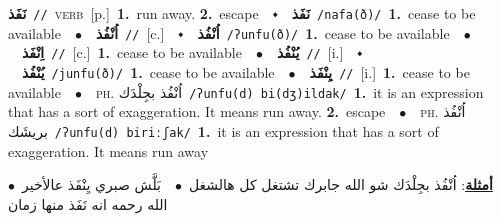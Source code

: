 \documentclass[10pt,a4paper,twoside]{article} %
\begin{document}
\begin{multicols}{2}
{\setlength\topsep{0pt}\textbf{\foreignlanguage{arabic}{نَفَذ}}\ {\color{gray}\texttt{//}\color{black}}\ \textsc{verb}\ [p.]\ \textbf{1.}~run away.  \textbf{2.}~escape\ \ $\smblkdiamond$\ \ \setlength\topsep{0pt}\textbf{\foreignlanguage{arabic}{نَفَذ}}\ {\color{gray}\texttt{/nafa(ð)/}\color{black}}\ \textbf{1.}~cease to be available\ \ $\bullet$\ \ \setlength\topsep{0pt}\textbf{\foreignlanguage{arabic}{اُنْفُذ}}\ {\color{gray}\texttt{//}\color{black}}\ [c.]\ \ $\smblkdiamond$\ \ \setlength\topsep{0pt}\textbf{\foreignlanguage{arabic}{اُنْفُذ}}\ {\color{gray}\texttt{/ʔunfu(ð)/}\color{black}}\ \textbf{1.}~cease to be available\ \ $\bullet$\ \ \setlength\topsep{0pt}\textbf{\foreignlanguage{arabic}{اِنْفَذ}}\ {\color{gray}\texttt{//}\color{black}}\ [c.]\ \textbf{1.}~cease to be available\ \ $\bullet$\ \ \setlength\topsep{0pt}\textbf{\foreignlanguage{arabic}{يُنْفُذ}}\ {\color{gray}\texttt{//}\color{black}}\ [i.]\ \ $\smblkdiamond$\ \ \setlength\topsep{0pt}\textbf{\foreignlanguage{arabic}{يُنْفُذ}}\ {\color{gray}\texttt{/junfu(ð)/}\color{black}}\ \textbf{1.}~cease to be available\ \ $\bullet$\ \ \setlength\topsep{0pt}\textbf{\foreignlanguage{arabic}{يِنْفَذ}}\ {\color{gray}\texttt{//}\color{black}}\ [i.]\ \textbf{1.}~cease to be available\ \ $\bullet$\ \ \textsc{ph.} \color{gray} \foreignlanguage{arabic}{اُنْفُذ بجِلْدَك}\color{black}\ {\color{gray}\texttt{/{\sffamily ʔunfu(d) bi(dʒ)ildak}/}\color{black}}\ \textbf{1.}~it is an expression that has a sort of exaggeration. It means run away.  \textbf{2.}~escape\ \ $\bullet$\ \ \textsc{ph.} \color{gray} \foreignlanguage{arabic}{اُنْفُذ بريشَك}\color{black}\ {\color{gray}\texttt{/{\sffamily ʔunfu(d) biriːʃak}/}\color{black}}\ \textbf{1.}~it is an expression that has a sort of exaggeration. It means run away\  \begin{flushright}\color{gray}\foreignlanguage{arabic}{\textbf{\underline{\foreignlanguage{arabic}{أمثلة}}}: اُنْفُذ بجِلْدَك شو الله جابرك تشتغل كل هالشغل\ $\bullet$\ \  بَلَّش صبري يِنْفَذ عالأخير\ $\bullet$\ \  الله رحمه انه نَفَذ منها زمان}\end{flushright}\color{black}} \vspace{2mm}


\end{multicols}
\end{document}

